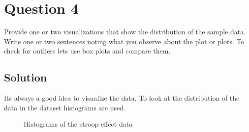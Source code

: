 \documentclass[12pt]{article}%
\begin{document}
\section*{Question 4}

 Provide one or two visualizations that show the distribution of the sample data. Write one or two sentences noting what you observe about the plot or plots. To check for outliers lets use box plots and compare them.

\subsection*{Solution}

Its always a good idea to visualize the data. To look at the distribution of the data in the dataset histograms are used.
 \begin{figure}[h]
     \centering
     \qquad
     \caption{Histograms of the stroop effect data}%
     \label{fig:example}%
 \end{figure}
\end{document}
